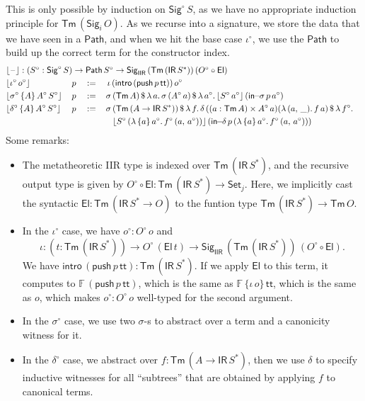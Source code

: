 \documentclass[acmsmall,screen,review,anonymous]{acmart}
\newcommand{\msf}[1]{{\mathsf{#1}}}
\newcommand{\mbb}[1]{\mathbb{#1}}
\newcommand{\push}{\mathsf{push}}
\newcommand{\Set}{\msf{Set}}
\newcommand{\El}{\msf{El}}
\newcommand{\Sig}{\msf{Sig}}
\newcommand{\ttt}{\msf{tt}}
\newcommand{\blank}{{\mathord{\hspace{1pt}\text{--}\hspace{1pt}}}}
\newcommand{\IR}{\msf{IR}}
\newcommand{\intro}{\msf{intro}}
\newcommand{\IIR}{\msf{IIR}}
\newcommand{\floord}[1]{\lfloor #1 \rfloor}
\newcommand{\Tm}{\msf{Tm}}
\newcommand{\w}{\circ}
\newcommand{\Path}{\msf{Path}}
\newcommand{\insigma}{\msf{in}\!\!-\!\!\sigma}
\newcommand{\indelta}{\msf{in}\!\!-\!\!\delta}
\newcommand{\F}{\mbb{F}}
\begin{document}
\begin{definition}
This is only possible by induction on $\Sig^\w\,S$, as we have no appropriate induction principle
for $\Tm\,(\Sig_i\,O)$.  As we recurse into a signature, we store the data that we have seen in a
$\Path$, and when we hit the base case $\iota^\w$, we use the $\Path$ to build up the correct term
for the constructor index.
\begin{alignat*}{5}
  &\rlap{$\floord{\blank} : (S^\w : \Sig^\w\,S) \to \Path\,S^\w \to \Sig_\IIR\,(\Tm\,(\IR\,S^*))\,(O^\w\circ \El)$}\\
  &\floord{\iota^\w\,o^\w}\,&&p               &&:=\,&&\,\iota\,(\intro\,(\push\,p\,\ttt))\,o^\w\\
  &\floord{\sigma^\w\,\{A\}\,A^\w\,S^\w}\,&&p &&:=\,&&\sigma\,(\Tm\,A)\,\$\,\lambda\,a.\,\sigma\,(A^\w\,a)\,\$\,\lambda\,a^\w.\,\floord{S^\w\,a^\w}\,(\insigma\,p\,a^\w)\\
  &\floord{\delta^\w\,\{A\}\,A^\w\,S^\w}\,&&p &&:=\,&&\sigma\,(\Tm\,(A \to \IR\,S^*))\,\$\,\lambda\,f.\,\delta\,((a : \Tm\,A) \times A^\w\,a) (\lambda\,(a,\,\_).\,f\,a)\,\$\,\lambda\,f^\w.\\
  &                       &&              &&   &&\hspace{0.8em}\floord{S^\w\,(\lambda\,\{a\}\,a^\w.\,f^\w\,(a,\,a^\w))}\,(\indelta\,p\,(\lambda\,\{a\}\,a^\w.\,f^\w\,(a,\,a^\w)))
\end{alignat*}
Some remarks:
\begin{itemize}
  \item The metatheoretic IIR type is indexed over $\Tm\,(\IR\,S^*)$, and the recursive output type
    is given by $O^\w\circ \El : \Tm\,(\IR\,S^*) \to \Set_j$. Here, we implicitly cast the syntactic
    $\El : \Tm\,(\IR\,S^* \to O)$ to the funtion type $\Tm\,(\IR\,S^*) \to \Tm\,O$.
  \item In the $\iota^\w$ case, we have $o^\w : O^\w\,o$ and
    \[ \iota : (t : \Tm\,(\IR\,S^*)) \to O^\w\,(\El\,t) \to \Sig_\IIR\,(\Tm\,(\IR\,S^*))\,(O^\w\circ \El). \]
    We have $\intro\,(\push\,p\,\ttt) : \Tm\,(\IR\,S^*)$. If we apply $\El$ to this term, it computes
    to $\F\,(\push\,p\,\ttt)$, which is the same as $\F\,\{\iota\,o\}\,\ttt$, which is the same
    as $o$, which makes $o^\w : O^\w\,o$ well-typed for the second argument.
  \item In the $\sigma^\w$ case, we use two $\sigma$-s to abstract over a term and a canonicity witness for it.
  \item In the $\delta^\w$ case, we abstract over $f : \Tm\,(A \to \IR\,S^*)$, then we use $\delta$ to specify inductive
        witnesses for all ``subtrees'' that are obtained by applying $f$ to canonical terms.
\end{itemize}
\end{definition}
\end{document}
